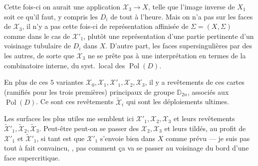 \documentclass[11pt,a4paper]{article}
\begin{document}
Cette fois-ci on aurait une application $\mathcal{X}_3 \to X$, telle que l'image inverse de $X_1$ soit ce qu'il faut,  y compris les $D_i$ de tout à l'heure. Mais on n'a  pas sur les faces  de $\mathcal{X}_3$, il n'y a pas cette fois-ci de représentation affinisée de $\Sigma = (X, \Sigma)$ comme dans le cas de $\mathcal{X}'_1$,  plutôt une représentation d'une partie pertinente d'un voisinage tubulaire  de $D_i$ dans $X$. D'autre part, les \struck{\ill{}} faces supersingulières  par des \ill{} \ill{} les autres, de sorte \struck{\ill{} \ill{} \ill{}} que $\mathcal{X}_3$ ne se prête pas à une interprétation en termes de la combinatoire interne, du syst.\ local des $\operatorname{Pol}(D)$.

En plus de ces $5$ variantes $\mathcal{X}_0, \mathcal{X}_1, \mathcal{X}'_1, \mathcal{X}_2, \mathcal{X}_3$, il y a   revêtements de ces cartes (ramifiés pour les trois premières) principaux de groupe $\mathbb{D}_{2n}$, associés aux $\operatorname{Pol}(D)$. Ce sont ces revêtements $\widetilde{\mathcal{X}}_i$ qui sont les déploiements ultimes.

Les surfaces les plus utiles me semblent ici $\mathcal{X}'_1, \mathcal{X}_2, \mathcal{X}_3$ et leurs revêtements $\widetilde{\mathcal{X}}'_1, \widetilde{\mathcal{X}}_2, \widetilde{\mathcal{X}}_3$. Peut-être peut-on se passer des $\mathcal{X}_2, \mathcal{X}_3$ et leurs tildés, au profit de $\mathcal{X}'_1$ et $\widetilde{\mathcal{X}}'_1$, si tant est que $\mathcal{X}'_1$ s'envoie bien dans $X$ comme prévu --- je  suis pas  tout à fait convaincu, ,   pas comment ça va se passer au voisinage du bord d'une face supercritique.

\end{document}
